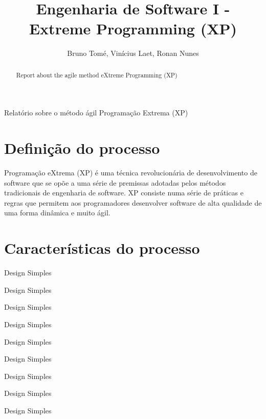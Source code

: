 \documentclass[12pt]{article}
\title{Engenharia de Software I - Extreme Programming (XP)}
\author{Bruno Tomé\inst{1}, Vinícius Laet\inst{1}, Ronan Nunes\inst{1}}
\begin{document}
 

\maketitle

\begin{abstract}
Report about the agile method eXtreme Programming (XP)
\end{abstract}
     
\begin{resumo} 
Relatório sobre o método ágil Programação Extrema (XP)
\end{resumo}

\section{Definição do processo}

Programação eXtrema (XP) é uma técnica revolucionária de desenvolvimento de software que se opõe a uma série de premissas adotadas pelos métodos tradicionais de engenharia de software. XP consiste numa série de práticas e regras que permitem aos programadores desenvolver software de alta qualidade de uma forma dinâmica e muito ágil.

\section{Características do processo}

\begin{listing}
\item{Design Simples}
\item{Design Simples}
\item{Design Simples}
\item{Design Simples}
\item{Design Simples}
\item{Design Simples}
\item{Design Simples}
\item{Design Simples}
\item{Design Simples}
\end{listing}
\end{document}

